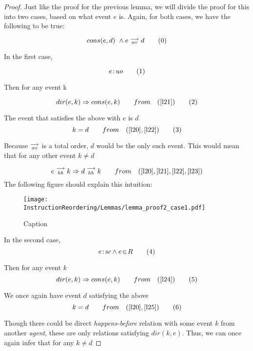 \begin{proof}
    
    Just like the proof for the previous lemma, we will divide the proof for this into two cases, based on what event $e$ is. Again, for both cases, we have the following to be true:
    
    \[
        cons(e,d) \ \wedge e\stackrel{\longrightarrow}{_{ao}}d
        \tag{0}
        \label{l20}
    \]

   In the first case,
   
   \[
        e\!:\!\textit{uo} 
        \tag{1}
        \label{l21}
   \]
   
   Then for any event k
   
   \[
        dir(e,k) \Rightarrow cons(e,k) 
        \qquad from
        \quad (\ref{l21})
        \tag{2}
        \label{l22}
   \]
   
   The event that satisfies the above with $e$ is $d$
   \[
        k = d 
        \qquad from 
        \quad (\ref{l20}, \ref{l22})
        \tag{3}
        \label{l23}
   \]
   
   Because $\stackrel{\longrightarrow}{_{ao}}$ is a total order, $d$ would be the only such event. This would mean that for any other event $k \neq d$
   
   \[
        e\stackrel{\longrightarrow}{_{hb}}k \Rightarrow d\stackrel{\longrightarrow}{_{hb}}k
        \qquad from 
        \quad (\ref{l20}, \ref{l21}, \ref{l22}, \ref{l23})
   \]
   The following figure should explain this intuition:  
    
    \begin{figure}[H]
        \centering
        \texttt{[image: InstructionReordering/Lemmas/lemma\_proof2\_case1.pdf]}
        \caption{Caption}
        \label{fig:my_label}
    \end{figure}
    
    In the second case,
    \[
        e\!:\!\textit{sc} \wedge e\!\in\!R
        \tag{4}
        \label{l24}
    \]
    
    Then for any event $k$
    \[
        dir(e,k) \Rightarrow cons(e,k)
        \qquad from \quad
        (\ref{l24})
        \tag{5}
        \label{l25}
    \]
    
    We once again have event $d$ satisfying the above   
    \[
        k = d 
        \qquad from \quad
        (\ref{l20}, \ref{l25})
        \tag{6}
        \label{l26}
    \]
    
    Though there could be direct \textit{happens-before} relation with some event $k$ from another \textit{agent}, these are only relations satisfying $dir(k,e)$. Thus, we can once again infer that for any $k \neq d$ 
    

\end{proof}
